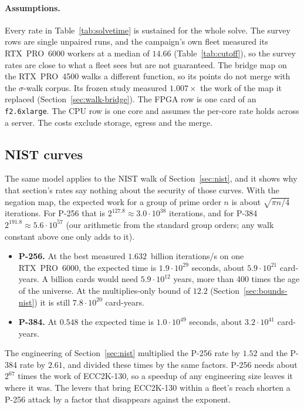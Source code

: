 \paragraph{Assumptions.} Every rate in
Table~\ref{tab:solvetime} is sustained for the whole solve. The survey
rows are single unpaired runs, and the campaign's own fleet measured
its RTX~PRO~6000 workers at a median of $14.66$
(Table~\ref{tab:cutoff}), so the survey rates are close to what a fleet
sees but are not guaranteed. The bridge map on the RTX~PRO~4500 walks a
different function, so its points do not merge with the
$\sigma$-walk corpus. Its frozen study measured $1.007\times$ the work
of the map it replaced (Section~\ref{sec:walk-bridge}). The FPGA row is
one card of an \texttt{f2.6xlarge}. The CPU row is one core and assumes
the per-core rate holds across a server. The costs exclude storage,
egress and the merge.

\subsection{NIST curves}
\label{sec:solvetime-nist}

The same model applies to the NIST walk of Section~\ref{sec:nist}, and
it shows why that section's rates say nothing about the security of
those curves. With the negation map, the expected work for a group of
prime order $n$ is about $\sqrt{\pi n/4}$ iterations. For P-256 that is
$2^{127.8}\approx3.0\cdot10^{38}$ iterations, and for P-384
$2^{191.8}\approx5.6\cdot10^{57}$ (our arithmetic from the standard group
orders; any walk constant above one only adds to it).
\begin{itemize}[nosep]
\item \textbf{P-256.} At the best measured $1.632$~billion
  iterations/s on one RTX~PRO~6000, the expected time is $1.9\cdot10^{29}$
  seconds, about $5.9\cdot10^{21}$ card-years. A billion cards would
  need $5.9\cdot10^{12}$ years, more than 400 times the age of the
  universe.
  At the multiplies-only bound of $12.2$ (Section~\ref{sec:bounds-nist})
  it is still $7.8\cdot10^{20}$ card-years.
\item \textbf{P-384.} At $0.548$ the expected time is $1.0\cdot10^{49}$
  seconds, about $3.2\cdot10^{41}$ card-years.
\end{itemize}
The engineering of Section~\ref{sec:nist} multiplied the P-256 rate by
$1.52$ and the P-384 rate by $2.61$, and divided these times by the
same factors. P-256 needs about $2^{67}$ times the work of ECC2K-130, so
a speedup of any engineering size leaves it where it was. The levers
that bring ECC2K-130 within a fleet's reach shorten a P-256 attack by a
factor that disappears against the exponent.
